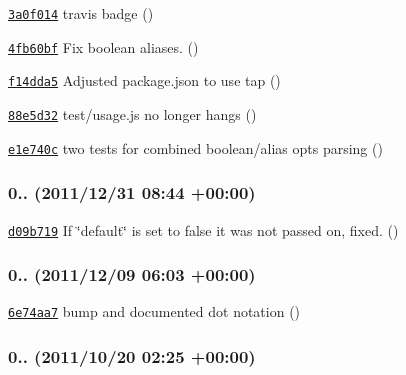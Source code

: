 \begin{DoxyItemize}
\item \href{https://github.com/bcoe/yargs/commit/3a0f014c1451280ac1c9caa1f639d31675586eec}{\tt 3a0f014} travis badge ()
\item \href{https://github.com/bcoe/yargs/commit/4fb60bf17845f4ce3293f8ca49c9a1a7c736cfce}{\tt 4fb60bf} Fix boolean aliases. ()
\item \href{https://github.com/bcoe/yargs/commit/f14dda546efc4fe06ace04d36919bfbb7634f79b}{\tt f14dda5} Adjusted package.\+json to use tap ()
\item \href{https://github.com/bcoe/yargs/commit/88e5d32295be6e544c8d355ff84e355af38a1c74}{\tt 88e5d32} test/usage.\+js no longer hangs ()
\item \href{https://github.com/bcoe/yargs/commit/e1e740c27082f3ce84deca2093d9db2ef735d0e5}{\tt e1e740c} two tests for combined boolean/alias opts parsing ()
\end{DoxyItemize}

\subsubsection*{0.. (2011/12/31 08\+:44 +00\+:00)}


\begin{DoxyItemize}
\item \href{https://github.com/bcoe/yargs/commit/d09b71980ef711b6cf3918cd19beec8257e40e82}{\tt d09b719} If \char`\"{}default\char`\"{} is set to false it was not passed on, fixed. ()
\end{DoxyItemize}

\subsubsection*{0.. (2011/12/09 06\+:03 +00\+:00)}


\begin{DoxyItemize}
\item \href{https://github.com/bcoe/yargs/commit/6e74aa7b46a65773e20c0cb68d2d336d4a0d553d}{\tt 6e74aa7} bump and documented dot notation ()
\end{DoxyItemize}

\subsubsection*{0.. (2011/10/20 02\+:25 +00\+:00)}


